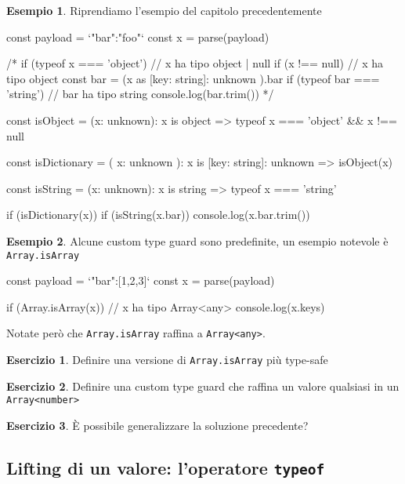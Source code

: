 \documentclass[12pt]{article}
\theoremstyle{definition}
\newtheorem{example}{Esempio}[subsection]
\newtheorem{exercise}{Esercizio}[subsection]
\newenvironment{code}
  {\vspace{0.5cm} \VerbatimEnvironment\begin{typescriptcode}}
  {\end{typescriptcode} \vspace{0.2cm}}
\begin{document}
\begin{example}
Riprendiamo l'esempio del capitolo precedentemente

\begin{code}
const payload = `{"bar":"foo"}`
const x = parse(payload)

/*
if (typeof x === 'object') {
  // x ha tipo object | null
  if (x !== null) {
    // x ha tipo object
    const bar = (x as { [key: string]: unknown }).bar
    if (typeof bar === 'string') {
      // bar ha tipo string
      console.log(bar.trim())
    }
  }
}
*/

const isObject = (x: unknown): x is object =>
  typeof x === 'object' && x !== null

const isDictionary = (
  x: unknown
): x is { [key: string]: unknown } => isObject(x)

const isString = (x: unknown): x is string =>
  typeof x === 'string'

if (isDictionary(x)) {
  if (isString(x.bar)) {
    console.log(x.bar.trim())
  }
}
\end{code}
\end{example}

\begin{example}
Alcune custom type guard sono predefinite, un esempio notevole è \texttt{Array.isArray}

\begin{code}
const payload = `{"bar":[1,2,3]}`
const x = parse(payload)

if (Array.isArray(x)) {
  // x ha tipo Array<any>
  console.log(x.keys)
}
\end{code}
\end{example}

Notate però che \texttt{Array.isArray} raffina a \texttt{Array<any>}.

\begin{exercise}
Definire una versione di \texttt{Array.isArray} più type-safe
\end{exercise}

\begin{exercise}
Definire una custom type guard che raffina un valore qualsiasi in un \texttt{Array<number>}
\end{exercise}

\begin{exercise}
È possibile generalizzare la soluzione precedente?
\end{exercise}

\subsection{Lifting di un valore: l'operatore \texttt{typeof}}
\end{document}
